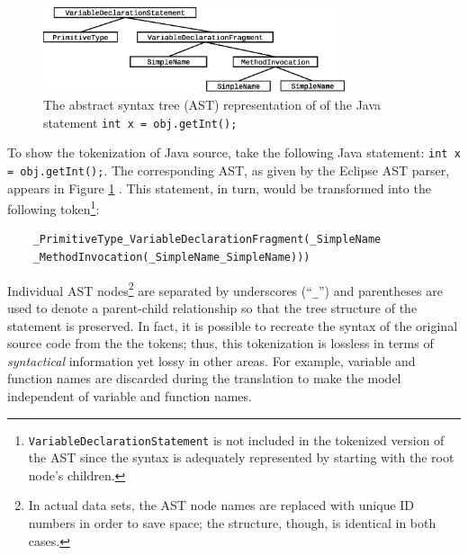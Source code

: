 \documentclass[runningheads,a4paper]{llncs}
\begin{document}
\begin{figure}%
\begin{center}
\centerline{\includegraphics[height=25mm]{ast.eps}}
\caption{The abstract syntax tree (AST) representation of of the Java statement
\texttt{int x = obj.getInt();}}
\label{ast-figure}
\end{center}
\vskip -7mm
\end{figure} 

To show the tokenization of Java source, take the following Java statement:
\texttt{int x = obj.getInt();}.
The corresponding AST, as given by the Eclipse AST parser, appears in Figure \ref{ast-figure} \cite{Eclipse}.
This statement, in turn, would be transformed into the following token\footnote{
\texttt{VariableDeclarationStatement} is not included in the
tokenized version of the AST since the syntax is adequately represented
by starting with the root node's children.}:


\begin{verbatim}
    _PrimitiveType_VariableDeclarationFragment(_SimpleName
    _MethodInvocation(_SimpleName_SimpleName))) 
\end{verbatim}
%

Individual AST nodes\footnote{In actual data sets, the AST node names are replaced with unique
ID numbers in order to save space; the structure, though, is identical in both cases.}
are separated by underscores (``\texttt{\_}'') and parentheses are used
to denote a parent-child relationship so that the tree structure of
the statement is preserved. In fact, it is possible  to recreate the
syntax of the original source  code from the the tokens; thus, this 
tokenization is lossless in terms of  \textit{syntactical} information 
yet lossy in other areas. For example, variable and function names are
discarded during the translation to make the model independent of
variable and function names.
\end{document}
